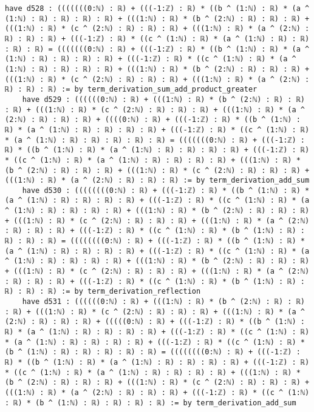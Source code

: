 \documentclass{article}
\begin{document}
\begin{tcolorbox}[colback=white!10, width=\linewidth]
\begin{lstlisting}[language=Lean4]
    have d528 : (((((((0:ℕ) : ℝ) + (((-1:ℤ) : ℝ) * ((b ^ (1:ℕ) : ℝ) * (a ^ (1:ℕ) : ℝ) : ℝ) : ℝ) : ℝ) + (((1:ℕ) : ℝ) * (b ^ (2:ℕ) : ℝ) : ℝ) : ℝ) + (((1:ℕ) : ℝ) * (c ^ (2:ℕ) : ℝ) : ℝ) : ℝ) + (((1:ℕ) : ℝ) * (a ^ (2:ℕ) : ℝ) : ℝ) : ℝ) + (((-1:ℤ) : ℝ) * ((c ^ (1:ℕ) : ℝ) * (a ^ (1:ℕ) : ℝ) : ℝ) : ℝ) : ℝ) = (((((((0:ℕ) : ℝ) + (((-1:ℤ) : ℝ) * ((b ^ (1:ℕ) : ℝ) * (a ^ (1:ℕ) : ℝ) : ℝ) : ℝ) : ℝ) + (((-1:ℤ) : ℝ) * ((c ^ (1:ℕ) : ℝ) * (a ^ (1:ℕ) : ℝ) : ℝ) : ℝ) : ℝ) + (((1:ℕ) : ℝ) * (b ^ (2:ℕ) : ℝ) : ℝ) : ℝ) + (((1:ℕ) : ℝ) * (c ^ (2:ℕ) : ℝ) : ℝ) : ℝ) + (((1:ℕ) : ℝ) * (a ^ (2:ℕ) : ℝ) : ℝ) : ℝ) := by term_derivation_sum_add_product_greater
    have d529 : ((((((0:ℕ) : ℝ) + (((1:ℕ) : ℝ) * (b ^ (2:ℕ) : ℝ) : ℝ) : ℝ) + (((1:ℕ) : ℝ) * (c ^ (2:ℕ) : ℝ) : ℝ) : ℝ) + (((1:ℕ) : ℝ) * (a ^ (2:ℕ) : ℝ) : ℝ) : ℝ) + ((((0:ℕ) : ℝ) + (((-1:ℤ) : ℝ) * ((b ^ (1:ℕ) : ℝ) * (a ^ (1:ℕ) : ℝ) : ℝ) : ℝ) : ℝ) + (((-1:ℤ) : ℝ) * ((c ^ (1:ℕ) : ℝ) * (a ^ (1:ℕ) : ℝ) : ℝ) : ℝ) : ℝ) : ℝ) = (((((((0:ℕ) : ℝ) + (((-1:ℤ) : ℝ) * ((b ^ (1:ℕ) : ℝ) * (a ^ (1:ℕ) : ℝ) : ℝ) : ℝ) : ℝ) + (((-1:ℤ) : ℝ) * ((c ^ (1:ℕ) : ℝ) * (a ^ (1:ℕ) : ℝ) : ℝ) : ℝ) : ℝ) + (((1:ℕ) : ℝ) * (b ^ (2:ℕ) : ℝ) : ℝ) : ℝ) + (((1:ℕ) : ℝ) * (c ^ (2:ℕ) : ℝ) : ℝ) : ℝ) + (((1:ℕ) : ℝ) * (a ^ (2:ℕ) : ℝ) : ℝ) : ℝ) := by term_derivation_add_sum
    have d530 : ((((((((0:ℕ) : ℝ) + (((-1:ℤ) : ℝ) * ((b ^ (1:ℕ) : ℝ) * (a ^ (1:ℕ) : ℝ) : ℝ) : ℝ) : ℝ) + (((-1:ℤ) : ℝ) * ((c ^ (1:ℕ) : ℝ) * (a ^ (1:ℕ) : ℝ) : ℝ) : ℝ) : ℝ) + (((1:ℕ) : ℝ) * (b ^ (2:ℕ) : ℝ) : ℝ) : ℝ) + (((1:ℕ) : ℝ) * (c ^ (2:ℕ) : ℝ) : ℝ) : ℝ) + (((1:ℕ) : ℝ) * (a ^ (2:ℕ) : ℝ) : ℝ) : ℝ) + (((-1:ℤ) : ℝ) * ((c ^ (1:ℕ) : ℝ) * (b ^ (1:ℕ) : ℝ) : ℝ) : ℝ) : ℝ) = ((((((((0:ℕ) : ℝ) + (((-1:ℤ) : ℝ) * ((b ^ (1:ℕ) : ℝ) * (a ^ (1:ℕ) : ℝ) : ℝ) : ℝ) : ℝ) + (((-1:ℤ) : ℝ) * ((c ^ (1:ℕ) : ℝ) * (a ^ (1:ℕ) : ℝ) : ℝ) : ℝ) : ℝ) + (((1:ℕ) : ℝ) * (b ^ (2:ℕ) : ℝ) : ℝ) : ℝ) + (((1:ℕ) : ℝ) * (c ^ (2:ℕ) : ℝ) : ℝ) : ℝ) + (((1:ℕ) : ℝ) * (a ^ (2:ℕ) : ℝ) : ℝ) : ℝ) + (((-1:ℤ) : ℝ) * ((c ^ (1:ℕ) : ℝ) * (b ^ (1:ℕ) : ℝ) : ℝ) : ℝ) : ℝ) := by term_derivation_reflection
    have d531 : ((((((0:ℕ) : ℝ) + (((1:ℕ) : ℝ) * (b ^ (2:ℕ) : ℝ) : ℝ) : ℝ) + (((1:ℕ) : ℝ) * (c ^ (2:ℕ) : ℝ) : ℝ) : ℝ) + (((1:ℕ) : ℝ) * (a ^ (2:ℕ) : ℝ) : ℝ) : ℝ) + (((((0:ℕ) : ℝ) + (((-1:ℤ) : ℝ) * ((b ^ (1:ℕ) : ℝ) * (a ^ (1:ℕ) : ℝ) : ℝ) : ℝ) : ℝ) + (((-1:ℤ) : ℝ) * ((c ^ (1:ℕ) : ℝ) * (a ^ (1:ℕ) : ℝ) : ℝ) : ℝ) : ℝ) + (((-1:ℤ) : ℝ) * ((c ^ (1:ℕ) : ℝ) * (b ^ (1:ℕ) : ℝ) : ℝ) : ℝ) : ℝ) : ℝ) = ((((((((0:ℕ) : ℝ) + (((-1:ℤ) : ℝ) * ((b ^ (1:ℕ) : ℝ) * (a ^ (1:ℕ) : ℝ) : ℝ) : ℝ) : ℝ) + (((-1:ℤ) : ℝ) * ((c ^ (1:ℕ) : ℝ) * (a ^ (1:ℕ) : ℝ) : ℝ) : ℝ) : ℝ) + (((1:ℕ) : ℝ) * (b ^ (2:ℕ) : ℝ) : ℝ) : ℝ) + (((1:ℕ) : ℝ) * (c ^ (2:ℕ) : ℝ) : ℝ) : ℝ) + (((1:ℕ) : ℝ) * (a ^ (2:ℕ) : ℝ) : ℝ) : ℝ) + (((-1:ℤ) : ℝ) * ((c ^ (1:ℕ) : ℝ) * (b ^ (1:ℕ) : ℝ) : ℝ) : ℝ) : ℝ) := by term_derivation_add_sum

\end{lstlisting}
\end{tcolorbox}
\end{document}
